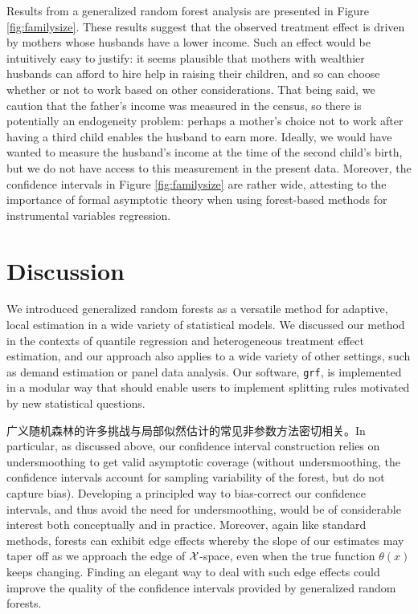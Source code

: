 \documentclass[aos]{imsart}
\theoremstyle{plain}
\theoremstyle{definition}
\theoremstyle{remark}
\begin{document}
\begin{CJK}{UTF8}{gbsn}
Results from a generalized random forest analysis are presented in Figure \ref{fig:familysize}. These results suggest that
the observed treatment effect is driven by mothers whose husbands have a lower income. Such an effect would
be intuitively easy to justify: it seems plausible that mothers with wealthier husbands can afford to hire help in raising their children,
and so can choose whether or not to work based on other considerations. That being said, we caution
that the father's income was measured in the census, so there is potentially an endogeneity
problem: perhaps a mother's choice not to work after having a third child enables the husband to earn more.
Ideally, we would have wanted to measure the husband's income at the time of the second child's birth, but
we do not have access to this measurement in the present data. Moreover, the confidence intervals in Figure \ref{fig:familysize}
are rather wide, attesting to the importance of formal asymptotic theory when using forest-based methods for instrumental
variables regression.

\section{Discussion}

We introduced generalized random forests as a versatile method for adaptive,
local estimation in a wide variety of statistical models. We discussed our method
in the contexts of quantile regression and heterogeneous treatment effect estimation,
and our approach also applies to a wide variety of other settings, such as
demand estimation or panel data analysis. Our software, \texttt{grf},
is implemented in a modular way that should enable users to implement
splitting rules motivated by new statistical questions.


广义随机森林的许多挑战与局部似然估计的常见非参数方法密切相关。In particular, as discussed
above, our confidence interval construction relies on undersmoothing to get valid asymptotic
coverage (without undersmoothing, the confidence intervals account for sampling variability of
the forest, but do not capture bias). Developing a principled way to bias-correct our confidence
intervals, and thus avoid the need for undersmoothing, would be of considerable interest both
conceptually and in practice. Moreover, again like standard methods, forests can exhibit edge
effects whereby the slope of our estimates  may taper off
as we approach the edge of $\mathcal{X}$-space, even when the true function $\theta(x)$ keeps
changing. Finding an elegant way to deal with such edge effects could improve the
quality of the confidence intervals provided by generalized random forests.


\end{CJK}
\end{document}
